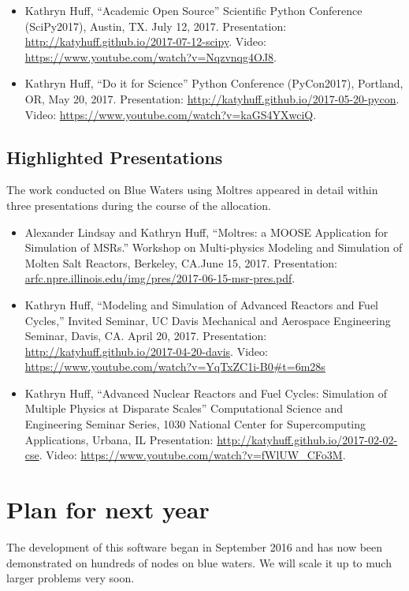\documentclass[letterpaper]{article}
\begin{document}
\begin{itemize}
\item Kathryn Huff, ``Academic Open Source'' Scientific Python Conference 
(SciPy2017), Austin, TX. July 12, 2017.  
Presentation: \url{http://katyhuff.github.io/2017-07-12-scipy}. Video: 
\url{https://www.youtube.com/watch?v=Nqzvnqg4OJ8}.
\item Kathryn Huff, ``Do it for Science'' Python Conference (PyCon2017),
Portland, OR, May 20, 2017. Presentation: \url{http://katyhuff.github.io/2017-05-20-pycon}.
Video: \url{https://www.youtube.com/watch?v=kaGS4YXwciQ}.
\end{itemize}

\subsection{Highlighted Presentations} The work conducted on Blue Waters using 
Moltres appeared in detail within three presentations during the course of the 
allocation. 

\begin{itemize}
\item Alexander Lindsay and Kathryn Huff, ``Moltres: a MOOSE Application for
Simulation of MSRs.'' Workshop on Multi-physics Modeling and Simulation of
Molten Salt Reactors, Berkeley, CA.June 15, 2017. Presentation:
\url{arfc.npre.illinois.edu/img/pres/2017-06-15-msr-pres.pdf}.
\item Kathryn Huff, ``Modeling and Simulation of Advanced Reactors and Fuel
Cycles,'' Invited Seminar, UC Davis Mechanical and Aerospace Engineering
Seminar, Davis, CA. April 20, 2017. Presentation:
\url{http://katyhuff.github.io/2017-04-20-davis}. Video:
\url{https://www.youtube.com/watch?v=YqTxZC1i-B0#t=6m28s}
\item Kathryn Huff, ``Advanced Nuclear Reactors and Fuel Cycles: Simulation of 
        Multiple Physics at Disparate Scales'' Computational Science and 
                Engineering Seminar Series, 1030 National Center for 
                Supercomputing Applications, Urbana, IL Presentation: 
                \url{http://katyhuff.github.io/2017-02-02-cse}.  Video: 
                \url{https://www.youtube.com/watch?v=fWlUW_CFo3M}.
\end{itemize}
\section{Plan for next year}

The development of this software  began in September 2016 and has now been
demonstrated on hundreds of nodes on blue waters. We will scale it up to much
larger problems very soon.
\end{document}

